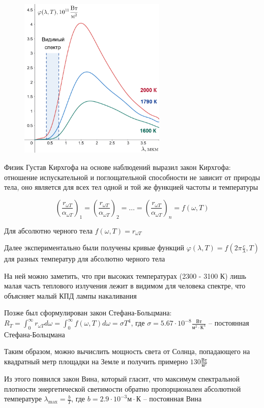 \documentclass[12pt]{article}
\begin{document}
\begin{figure}
    \includegraphics[width=7cm]{physics3/images/physics3_kirchhoff_law_functions}
\end{figure}

Физик Густав Кирхгофа на основе наблюдений выразил закон Кирхгофа: отношение испускательной и поглощательной способности не зависит от природы тела, оно является для всех тел одной и той же функцией частоты и температуры

\[\left(\frac{r_{\omega T}}{\alpha_{\omega T}}\right)_1 = \left(\frac{r_{\omega T}}{\alpha_{\omega T}}\right)_2 = \dots = \left(\frac{r_{\omega T}}{\alpha_{\omega T}}\right)_n = f(\omega, T)\]

Для абсолютно черного тела $f(\omega, T) = r_{\omega T}$

Далее экспериментально были получены кривые функций $\varphi(\lambda, T) = f\left(2\pi \frac{c}{\lambda}, T\right)$ для разных температур для абсолютно черного тела

На ней можно заметить, что при высоких температурах (2300 - 3100 К) лишь малая часть теплового излучения лежит в видимом для человека спектре, что объясняет малый КПД лампы накаливания


Позже был сформулирован закон Стефана-Больцмана: $R_T = \int_0^\infty r_{\omega T} d\omega = \int_0^\infty f(\omega, T) d\omega = \sigma T^4$, где $\sigma = 5.67 \cdot 10^{-8} \frac{\text{Вт}}{\text{м}^2 \cdot \text{К}^4}$ -- постоянная Стефана-Больцмана

Таким образом, можно вычислить мощность света от Солнца, попадающего на квадратный метр площадки на Земле и получить примерно $130 \frac{\text{Вт}}{\text{м}^2}$

Из этого появился закон Вина, который гласит, что максимум спектральной плотности энергетической светимости обратно пропорционален абсолютной температуре $\lambda_{\max} = \frac{b}{T}$, где $b = 2.9 \cdot 10^{-3} \text{м}\cdot\text{К}$ -- постоянная Вина
\end{document}
